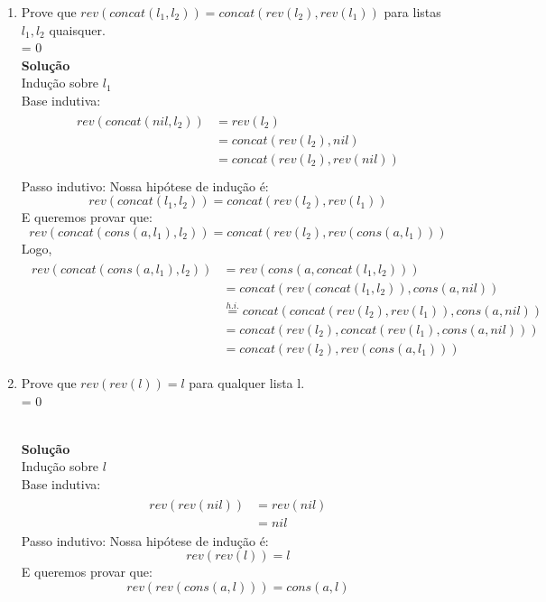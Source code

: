 \documentclass[a4paper]{article}
\newcommand{\answer}[2]{\ifnum#1= 0  {\color{blue} #2}\else \fi}
\begin{document}
\begin{enumerate}
\item Prove que $rev(concat(l_1,l_2)) = concat(rev(l_2), rev(l_1))$ para
  listas $l_1, l_2$ quaisquer.\\
  \answer{0}{\\ 
    {\bf Solução} \\
    Indução sobre $l_1$\\
    Base indutiva:
    \begin{align*}
      \begin{split}
        rev(concat(nil,l_2)) &= rev(l_2)\\
        &= concat(rev(l_2),nil)\\
        &= concat(rev(l_2),rev(nil))\\
      \end{split}
    \end{align*}
    Passo indutivo: Nossa hipótese de indução é:
    $$ rev(concat(l_1,l_2)) = concat(rev(l_2),rev(l_1))$$
    E queremos provar que:
    $$ rev(concat(cons(a,l_1),l_2)) = concat(rev(l_2),rev(cons(a,l_1)))$$
    Logo,
    \begin{align*}
      \begin{split}
        rev(concat(cons(a,l_1),l_2)) &= rev(cons(a,concat(l_1,l_2)))\\
        &= concat(rev(concat(l_1,l_2)),cons(a,nil))\\
        &\stackrel{h.i.}{=}concat(concat(rev(l_2),rev(l_1)),cons(a,nil))\\
        &=concat(rev(l_2),concat(rev(l_1),cons(a,nil)))\\
        &=concat(rev(l_2),rev(cons(a,l_1)))
      \end{split}
    \end{align*}
  }
  
\item Prove que $rev(rev(l)) = l$ para qualquer lista l.\\
  \answer{0}{\\ 
    {\bf Solução} \\
    Indução sobre $l$\\
    Base indutiva:
    \begin{align*}
      \begin{split}
        rev(rev(nil)) &= rev(nil)\\
        &= nil
      \end{split}
    \end{align*}
    Passo indutivo: Nossa hipótese de indução é:
    $$ rev(rev(l)) = l$$
    E queremos provar que:
    $$ rev(rev(cons(a,l))) = cons(a,l)$$
    
}
\end{enumerate}
\end{document}
